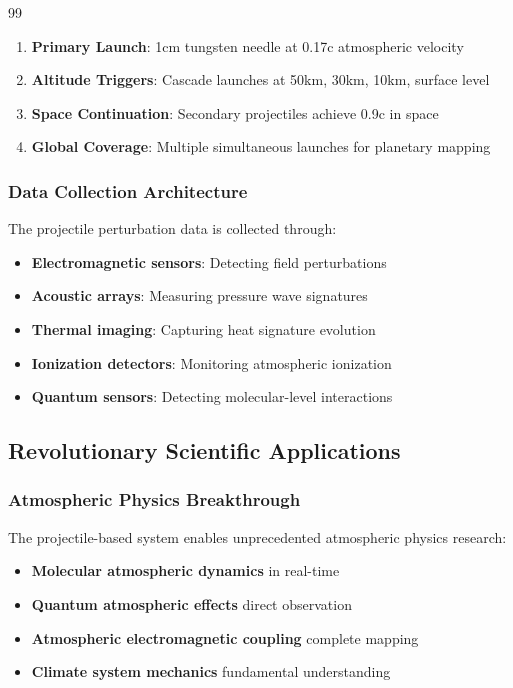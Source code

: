 \documentclass[12pt,a4paper]{article}
\begin{document}
\begin{thebibliography}{99}
\begin{enumerate}
\item \textbf{Primary Launch}: 1cm tungsten needle at 0.17c atmospheric velocity
\item \textbf{Altitude Triggers}: Cascade launches at 50km, 30km, 10km, surface level
\item \textbf{Space Continuation}: Secondary projectiles achieve 0.9c in space
\item \textbf{Global Coverage}: Multiple simultaneous launches for planetary mapping
\end{enumerate}

\subsubsection{Data Collection Architecture}

The projectile perturbation data is collected through:
\begin{itemize}
\item \textbf{Electromagnetic sensors}: Detecting field perturbations
\item \textbf{Acoustic arrays}: Measuring pressure wave signatures  
\item \textbf{Thermal imaging}: Capturing heat signature evolution
\item \textbf{Ionization detectors}: Monitoring atmospheric ionization
\item \textbf{Quantum sensors}: Detecting molecular-level interactions
\end{itemize}

\subsection{Revolutionary Scientific Applications}

\subsubsection{Atmospheric Physics Breakthrough}

The projectile-based system enables unprecedented atmospheric physics research:
\begin{itemize}
\item \textbf{Molecular atmospheric dynamics} in real-time
\item \textbf{Quantum atmospheric effects} direct observation
\item \textbf{Atmospheric electromagnetic coupling} complete mapping
\item \textbf{Climate system mechanics} fundamental understanding
\end{itemize}


\end{thebibliography}
\end{document}
